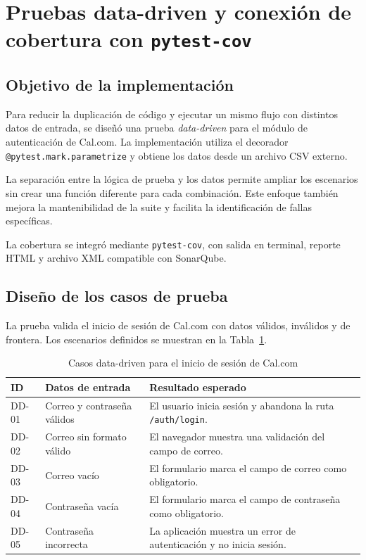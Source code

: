 \documentclass[12pt,letterpaper]{article}
\begin{document}
\section{Pruebas data-driven y conexión de cobertura con \texttt{pytest-cov}}

\subsection{Objetivo de la implementación}

Para reducir la duplicación de código y ejecutar un mismo flujo con distintos datos de entrada, se diseñó una prueba \textit{data-driven} para el módulo de autenticación de Cal.com. La implementación utiliza el decorador \texttt{@pytest.mark.parametrize} y obtiene los datos desde un archivo CSV externo.

La separación entre la lógica de prueba y los datos permite ampliar los escenarios sin crear una función diferente para cada combinación. Este enfoque también mejora la mantenibilidad de la suite y facilita la identificación de fallas específicas.

La cobertura se integró mediante \texttt{pytest-cov}, con salida en terminal, reporte HTML y archivo XML compatible con SonarQube.

\subsection{Diseño de los casos de prueba}

La prueba valida el inicio de sesión de Cal.com con datos válidos, inválidos y de frontera. Los escenarios definidos se muestran en la Tabla~\ref{tab:data-driven-login}.

\begin{table}[H]
\centering
\caption{Casos data-driven para el inicio de sesión de Cal.com}
\label{tab:data-driven-login}
\begin{tabularx}{\textwidth}{|>{\centering\arraybackslash}p{1.4cm}|X|X|}
\hline
\textbf{ID} & \textbf{Datos de entrada} & \textbf{Resultado esperado} \\
\hline
DD-01 & Correo y contraseña válidos & El usuario inicia sesión y abandona la ruta \texttt{/auth/login}. \\
\hline
DD-02 & Correo sin formato válido & El navegador muestra una validación del campo de correo. \\
\hline
DD-03 & Correo vacío & El formulario marca el campo de correo como obligatorio. \\
\hline
DD-04 & Contraseña vacía & El formulario marca el campo de contraseña como obligatorio. \\
\hline
DD-05 & Contraseña incorrecta & La aplicación muestra un error de autenticación y no inicia sesión. \\
\hline
\end{tabularx}
\end{table}
\end{document}
